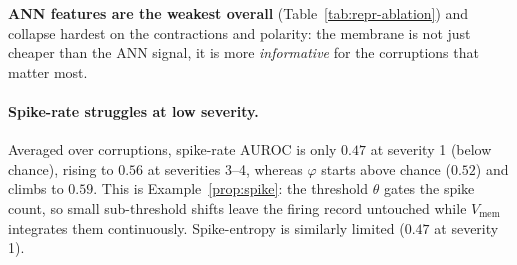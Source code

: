 ﻿\documentclass{article} %
\theoremstyle{remark}
\begin{document}
\begin{table}[t]
  \centering\small
  \caption{Representation ablation, per-corruption Mahalanobis AUROC averaged over all five
  severities; \textbf{bold} marks the best representation per corruption.}
  \label{tab:repr-ablation}
\end{table}

\textbf{ANN features are the weakest overall} (Table~\ref{tab:repr-ablation}) and collapse hardest
on the contractions and polarity: the membrane is not just cheaper than the ANN signal, it is more
\emph{informative} for the corruptions that matter most.

\paragraph{Spike-rate struggles at low severity.}
Averaged over corruptions, spike-rate AUROC is only $0.47$ at severity 1 (below chance), rising to
$0.56$ at severities 3--4, whereas $\varphi$ starts above chance ($0.52$) and climbs to $0.59$. This
is Example~\ref{prop:spike}: the threshold $\theta$ gates the spike count, so small sub-threshold
shifts leave the firing record untouched while $V_\text{mem}$ integrates them continuously.
Spike-entropy is similarly limited ($0.47$ at severity 1).
\end{document}
